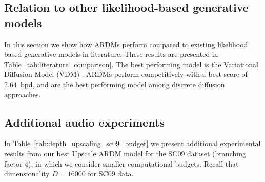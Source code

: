 \documentclass{article} \usepackage{iclr2022_conference,times}
\begin{document}
\subsection{Relation to other likelihood-based generative models}

In this section we show how ARDMs perform compared to existing likelihood based generative models in literature. These results are presented in Table~\ref{tab:literature_comparison}. The best performing model is the Variational Diffusion Model (VDM) \citep{kingma2021vdm}. ARDMs perform competitively with a best score of $2.64$~bpd, and are the best performing model among discrete diffusion approaches.
\begin{table}[h!]
\vspace{-.2cm}
    \centering
    \caption{CIFAR-10 generative modelling.}
    \label{tab:literature_comparison}
\end{table}


\subsection{Additional audio experiments}
In Table~\ref{tab:depth_upscaling_sc09_budget} we present additional experimental results from our best Upscale ARDM model for the SC09 dataset (branching factor $4$), in which we consider smaller computational budgets. Recall that dimensionality $D=16000$ for SC09 data.
\end{document}
